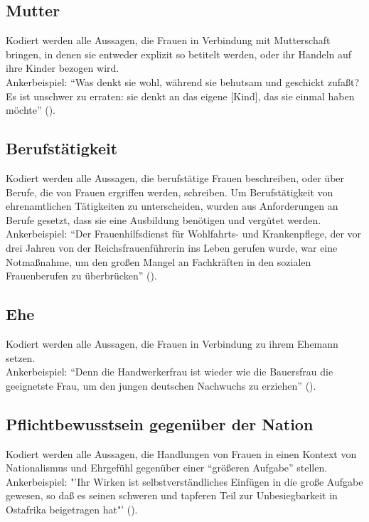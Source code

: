 \documentclass[12pt, titlepage=true, toc=bib]{scrartcl}
\begin{document}
\subsection*{Mutter}

Kodiert werden alle Aussagen, die Frauen in Verbindung mit Mutterschaft bringen, in denen sie entweder explizit so betitelt werden, oder ihr Handeln auf ihre Kinder bezogen wird.\\
Ankerbeispiel: "`Was denkt sie wohl, während sie behutsam und geschickt zufaßt? Es ist unschwer zu erraten: sie denkt an das eigene [Kind], das sie einmal haben möchte"' (\cite[775]{a._v._s._kameradschaft_1936}).

\subsection*{Berufstätigkeit}

Kodiert werden alle Aussagen, die berufstätige Frauen beschreiben, oder über Berufe, die von Frauen ergriffen werden, schreiben. Um Berufstätigkeit von ehrenamtlichen Tätigkeiten zu unterscheiden, wurden aus Anforderungen an Berufe gesetzt, dass sie eine Ausbildung benötigen und vergütet werden.\\
Ankerbeispiel: "`Der Frauenhilfsdienst für Wohlfahrts- und Krankenpflege, der vor drei Jahren von der Reichsfrauenführerin ins Leben gerufen wurde, war eine Notmaßnahme, um den großen Mangel an Fachkräften in den sozialen Frauenberufen zu überbrücken"' (\cite[22]{reimer_glucklich_1941}).

\subsection*{Ehe}

Kodiert werden alle Aussagen, die Frauen in Verbindung zu ihrem Ehemann setzen.\\
Ankerbeispiel: "`Denn die Handwerkerfrau ist wieder wie die Bauersfrau die geeignetste Frau, um den jungen deutschen Nachwuchs zu erziehen"' (\cite[836]{scholtz-klink_frauen_1936}).

\subsection*{Pflichtbewusstsein gegenüber der Nation}

Kodiert werden alle Aussagen, die Handlungen von Frauen in einen Kontext von Nationalismus und Ehrgefühl gegenüber einer "`größeren Aufgabe"' stellen.\\
Ankerbeispiel: "'Ihr Wirken ist selbstverständliches Einfügen in die große Aufgabe gewesen, so daß es seinen schweren und tapferen Teil zur Unbesiegbarkeit in Ostafrika beigetragen hat"' (\cite[669]{maltzahn_deutsche_1936}).
\end{document}
